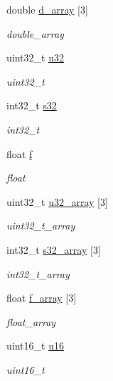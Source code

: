 \begin{DoxyCompactItemize}
double \hyperlink{struct____mavlink__test__types__t_a913629e4c956a6180cd9fdaaf8ccdb87}{d\+\_\+array} \mbox{[}3\mbox{]}
\begin{DoxyCompactList}\small\item\em double\+\_\+array \end{DoxyCompactList}\item 
uint32\+\_\+t \hyperlink{struct____mavlink__test__types__t_ad7afc9ca3801a1f7c8af018609bbf284}{u32}
\begin{DoxyCompactList}\small\item\em uint32\+\_\+t \end{DoxyCompactList}\item 
int32\+\_\+t \hyperlink{struct____mavlink__test__types__t_a709e0bb2dcda0c35fca9aa1d50ea7ccf}{s32}
\begin{DoxyCompactList}\small\item\em int32\+\_\+t \end{DoxyCompactList}\item 
float \hyperlink{struct____mavlink__test__types__t_ac9b429bd7a2999f549f6d41a30daae0a}{f}
\begin{DoxyCompactList}\small\item\em float \end{DoxyCompactList}\item 
uint32\+\_\+t \hyperlink{struct____mavlink__test__types__t_a7cb5059b23b9cce275e520705015fc18}{u32\+\_\+array} \mbox{[}3\mbox{]}
\begin{DoxyCompactList}\small\item\em uint32\+\_\+t\+\_\+array \end{DoxyCompactList}\item 
int32\+\_\+t \hyperlink{struct____mavlink__test__types__t_a00acc819e66f8295e2c7dec1aff31bf1}{s32\+\_\+array} \mbox{[}3\mbox{]}
\begin{DoxyCompactList}\small\item\em int32\+\_\+t\+\_\+array \end{DoxyCompactList}\item 
float \hyperlink{struct____mavlink__test__types__t_af5e47188c3007e37bd07c0dd20369f26}{f\+\_\+array} \mbox{[}3\mbox{]}
\begin{DoxyCompactList}\small\item\em float\+\_\+array \end{DoxyCompactList}\item 
uint16\+\_\+t \hyperlink{struct____mavlink__test__types__t_ab2db1b1b641ed71c6ee0e351f8ac40d4}{u16}
\begin{DoxyCompactList}\small\item\em uint16\+\_\+t \end{DoxyCompactList}\item 

\end{DoxyCompactItemize}
